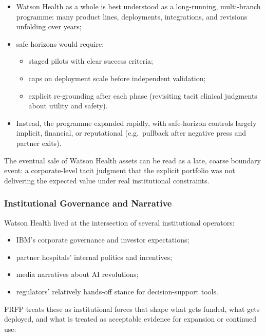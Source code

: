 \begin{itemize}
\item Watson Health as a whole is best understood as a long-running, multi-branch programme:
        many product lines, deployments, integrations, and revisions unfolding over years;
  \item safe horizons would require:
        \begin{itemize}
          \item staged pilots with clear success criteria;
          \item caps on deployment scale before independent validation;
          \item explicit re-grounding after each phase (revisiting tacit
                clinical judgments about utility and safety).
        \end{itemize}
  \item Instead, the programme expanded rapidly, with safe-horizon controls
        largely implicit, financial, or reputational (e.g.\ pullback after
        negative press and partner exits).
\end{itemize}

The eventual sale of Watson Health assets can be read as a late, coarse boundary
event: a corporate-level tacit judgment that the explicit portfolio was not
delivering the expected value under real institutional constraints.

\subsubsection*{Institutional Governance and Narrative}

Watson Health lived at the intersection of several institutional operators:

\begin{itemize}
  \item IBM’s corporate governance and investor expectations;
  \item partner hospitals’ internal politics and incentives;
  \item media narratives about AI revolutions;
  \item regulators’ relatively hands-off stance for decision-support tools.
\end{itemize}

FRFP treats these as institutional forces that shape what gets funded, what gets deployed, and what is treated as acceptable evidence for expansion or continued use:

